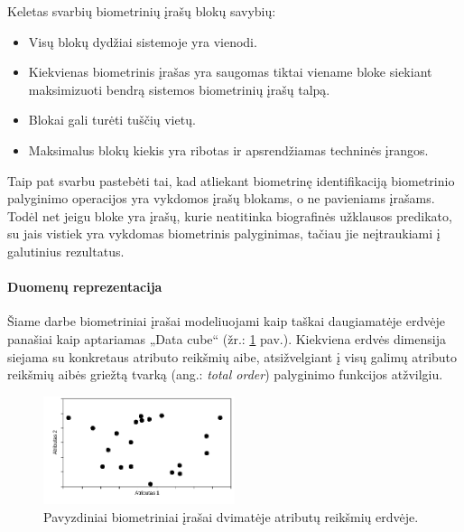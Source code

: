 Keletas svarbių biometrinių įrašų blokų savybių:
\begin{itemize}
\item Visų blokų dydžiai sistemoje yra vienodi.
\item Kiekvienas biometrinis įrašas yra saugomas tiktai viename bloke siekiant maksimizuoti bendrą sistemos biometrinių įrašų talpą.
\item Blokai gali turėti tuščių vietų.
\item Maksimalus blokų kiekis yra ribotas ir apsrendžiamas techninės įrangos.
\end{itemize}

Taip pat svarbu pastebėti tai, kad atliekant biometrinę identifikaciją biometrinio palyginimo operacijos yra vykdomos įrašų blokams, o ne pavieniams įrašams.
Todėl net jeigu bloke yra įrašų, kurie neatitinka biografinės užklausos predikato, su jais vistiek yra vykdomas biometrinis palyginimas, tačiau jie neįtraukiami į galutinius rezultatus.


\paragraph{Duomenų reprezentacija}

Šiame darbe biometriniai įrašai modeliuojami kaip taškai daugiamatėje erdvėje panašiai kaip \cite{marcel2000modeling} aptariamas „Data cube“ (žr.: \ref{img:multidimensionalGallery} pav.).
Kiekviena erdvės dimensija siejama su konkretaus atributo reikšmių aibe, atsižvelgiant į visų galimų atributo reikšmių aibės griežtą tvarką (ang.: {\it total order}) palyginimo funkcijos atžvilgiu.

\begin{figure}[H]
\begin{center}
\includegraphics[width=0.5\textwidth]{img/MultidimensionalGallery.png}
\caption{Pavyzdiniai biometriniai įrašai dvimatėje atributų reikšmių erdvėje.}
\label{img:multidimensionalGallery}
\end{center}
\end{figure}

